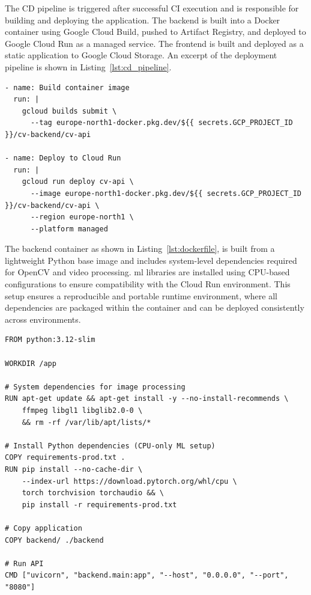 The CD pipeline is triggered after successful CI execution and is responsible for building and deploying the application. The backend is built into a Docker container using Google Cloud Build, pushed to Artifact Registry, and deployed to Google Cloud Run as a managed service. The frontend is built and deployed as a static application to Google Cloud Storage. An excerpt of the deployment pipeline is shown in Listing~\ref{lst:cd_pipeline}.

\begin{lstlisting}[caption={Excerpt from CD pipeline for deployment to Google Cloud}, label={lst:cd_pipeline}]
- name: Build container image
  run: |
    gcloud builds submit \
      --tag europe-north1-docker.pkg.dev/${{ secrets.GCP_PROJECT_ID }}/cv-backend/cv-api

- name: Deploy to Cloud Run
  run: |
    gcloud run deploy cv-api \
      --image europe-north1-docker.pkg.dev/${{ secrets.GCP_PROJECT_ID }}/cv-backend/cv-api \
      --region europe-north1 \
      --platform managed
\end{lstlisting}


The backend container as shown in Listing~\ref{lst:dockerfile}, is built from a lightweight Python base image and includes system-level dependencies required for OpenCV and video processing. \acrshort{ml} libraries are installed using CPU-based configurations to ensure compatibility with the Cloud Run environment. This setup ensures a reproducible and portable runtime environment, where all dependencies are packaged within the container and can be deployed consistently across environments.

\begin{lstlisting}[caption={Simplified Dockerfile for backend deployment}, label={lst:dockerfile}]
FROM python:3.12-slim

WORKDIR /app

# System dependencies for image processing
RUN apt-get update && apt-get install -y --no-install-recommends \
    ffmpeg libgl1 libglib2.0-0 \
    && rm -rf /var/lib/apt/lists/*

# Install Python dependencies (CPU-only ML setup)
COPY requirements-prod.txt .
RUN pip install --no-cache-dir \
    --index-url https://download.pytorch.org/whl/cpu \
    torch torchvision torchaudio && \
    pip install -r requirements-prod.txt

# Copy application
COPY backend/ ./backend

# Run API
CMD ["uvicorn", "backend.main:app", "--host", "0.0.0.0", "--port", "8080"]
\end{lstlisting}

